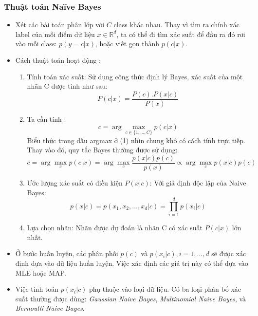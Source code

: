 \subsubsection{Thuật toán Naïve Bayes}
\begin{itemize}
     

\item Xét các bài toán phân lớp với \( C \) class khác nhau. Thay vì tìm ra chính xác label của mỗi điểm dữ liệu \( x \in \mathbb{R}^d \), ta có thể đi tìm xác suất để đầu ra đó rơi vào mỗi class: \( p(y = c | x) \), hoặc viết gọn thành \( p(c|x) \). \\

\item Cách thuật toán hoạt động :
\begin{enumerate}
    \item Tính toán xác suất:
    Sử dụng công thức định lý Bayes, xác suất của một nhãn C được tính như sau:
    \[P(c|x) = \frac{P(c).P(x|c)}{P(x)}\]
    \item Ta cần tính : 
    \[c = \arg\max_{c \in \{1, \ldots, C\}} p(c|x) \tag{1}\]
    Biểu thức trong dấu argmax ở (1) nhìn chung khó có cách tính trực tiếp. Thay vào đó, quy tắc Bayes thường được sử dụng:
\[c = \arg\max_{c} p(c|x) = \arg\max_{c} \frac{p(x|c) p(c)}{p(x)} \propto \arg\max_{c} p(x|c)p(c)
\]
    \item Ước lượng xác suất có điều kiện $P(x|c)$:
     Với giả định độc lập của Naive Bayes:
    \[p(x|c) = p(x_1, x_2, \ldots, x_d|c) = \prod_{i=1}^d p(x_i|c) \]
    \item Lựa chọn nhãn:
    Nhãn được dự đoán là nhãn C có xác suất $P(c|x)$  lớn nhất.
\end{enumerate}

\item Ở bước huấn luyện, các phân phối \( p(c) \) và \( p(x_i|c), i = 1, \ldots, d \) sẽ được xác định dựa vào dữ liệu huấn luyện. Việc xác định các giá trị này có thể dựa vào MLE hoặc MAP.\\
\item Việc tính toán \( p(x_i|c) \) phụ thuộc vào loại dữ liệu. Có ba loại phân bố xác suất thường được dùng: 
\textit{Gaussian Naive Bayes}, \textit{Multinomial Naive Bayes}, và \textit{Bernoulli Naive Bayes}.
\end{itemize}

